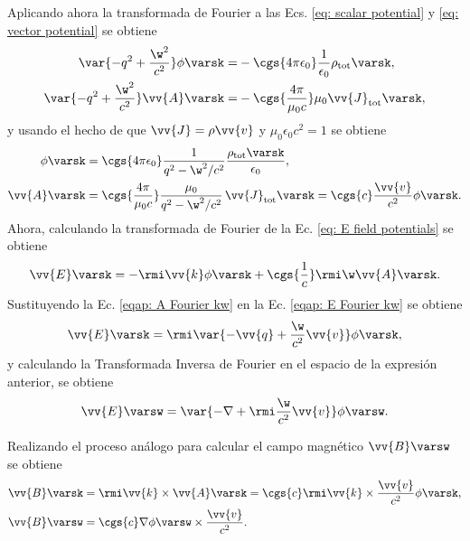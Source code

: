 Aplicando ahora la transformada de Fourier a las Ecs. \eqref{eq: scalar potential} y \eqref{eq: vector potential} se obtiene 
\begin{align}
\var{-q^2+\frac{\w^2}{c^2}}\phi\varsk =& -\cgs{4\pi\epsilon_0}\frac{1}{\epsilon_0}\rho_{\text{tot}}\varsk, \\
\var{-q^2+\frac{\w^2}{c^2}}\vv{A}\varsk =& - \cgs{\frac{4\pi}{\mu_0 c}}\mu_0\vv{J}_{\text{tot}}\varsk, 
\end{align}
y usando el hecho de que $\vv{J} = \rho \vv{v}$ y $\mu_0 \epsilon_0 c^2 = 1$ se obtiene
\begin{align}
\phi\varsk &= \cgs{4\pi\epsilon_0}\frac{1}{q^2-\w^2/c^2} \frac{\rho_{\rm tot}\varsk}{\epsilon_0}, \label{eqap: phi Fourier kw} \\
\vv{A}\varsk &= \cgs{\frac{4\pi}{\mu_0 c}}\frac{\mu_0}{q^2-\w^2/c^2}\,\vv{J}_{\text{tot}}\varsk = \cgs{c}\frac{\vv{v}}{c^2}\phi\varsk. \label{eqap: A Fourier kw}
\end{align}
Ahora, calculando la transformada de Fourier de la Ec. \eqref{eq: E field potentials} se obtiene 
\begin{equation}
\vv{E}\varsk = - \rmi \vv{k} \phi\varsk + \cgs{\frac{1}{c}}\rmi \w \vv{A}\varsk \label{eqap: E Fourier kw}.
\end{equation}
Sustituyendo la Ec. \eqref{eqap: A Fourier kw} en la Ec. \eqref{eqap: E Fourier kw} se obtiene
\begin{equation}
\vv{E}\varsk = \rmi \var{-\vv{q}+\frac{\w}{c^2}\vv{v}}\phi\varsk, 
\end{equation}
y calculando la Transformada Inversa de Fourier en el espacio de la expresión anterior, se obtiene
\begin{equation}
\vv{E}\varsw = \var{-\nabla+\rmi \frac{\w}{c^2}\vv{v}}\phi\varsw.
\end{equation}

Realizando el proceso análogo para calcular el campo magnético $\vv{B}\varsw$ se obtiene
\begin{align}
\vv{B}\varsk &= \rmi \vv{k}\times\vv{A}\varsk = \cgs{c}\rmi \vv{k}\times\frac{\vv{v}}{c^2}\phi\varsk,\\
\vv{B}\varsw &= \cgs{c}\nabla \phi\varsw\times\frac{\vv{v}}{c^2}.
\end{align}

